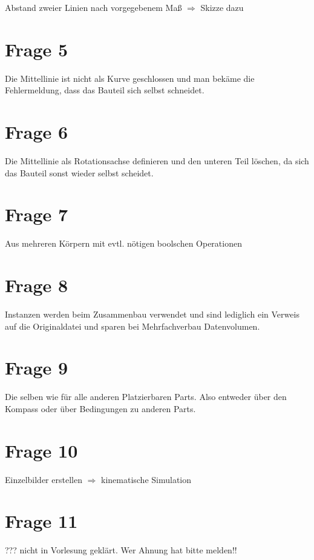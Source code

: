 Abstand zweier Linien nach vorgegebenem Maß $\Rightarrow$ Skizze dazu

\section{Frage 5}

Die Mittellinie ist nicht als Kurve geschlossen und man bekäme die Fehlermeldung, dass das Bauteil sich selbst schneidet.

\section{Frage 6}

Die Mittellinie als Rotationsachse definieren und den unteren Teil löschen, da sich das Bauteil sonst wieder selbst scheidet.

\section{Frage 7}

Aus mehreren Körpern mit evtl. nötigen boolschen Operationen

\section{Frage 8}

Instanzen werden beim Zusammenbau verwendet und sind lediglich ein Verweis auf die Originaldatei und sparen bei Mehrfachverbau Datenvolumen.

\section{Frage 9}

Die selben wie für alle anderen Platzierbaren Parts. Also entweder über den Kompass oder über Bedingungen zu anderen Parts.

\section{Frage 10}

Einzelbilder erstellen $\Rightarrow$ kinematische Simulation


\section{Frage 11}

??? nicht in Vorlesung geklärt. Wer Ahnung hat bitte melden!!

